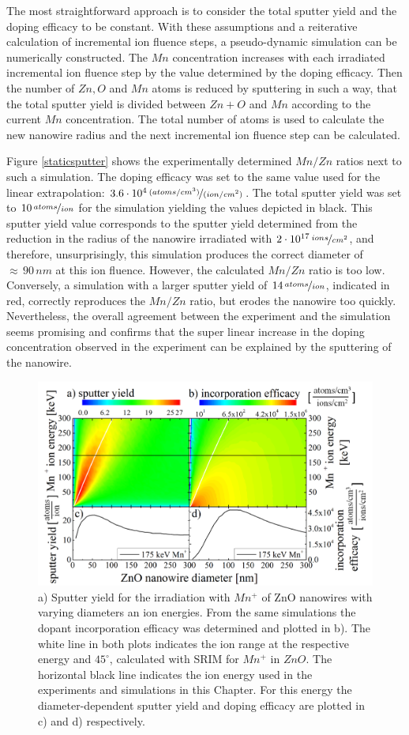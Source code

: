 The most straightforward approach is to consider the total sputter yield and the doping efficacy to be constant. With these assumptions and a reiterative calculation of incremental ion fluence steps, a pseudo-dynamic simulation can be numerically constructed. The $Mn$ concentration increases with each irradiated incremental ion fluence step by the value determined by the doping efficacy. Then the number of $Zn, O$ and $Mn$ atoms is reduced by sputtering in such a way, that the total sputter yield is divided between $Zn+O$ and $Mn$ according to the current $Mn$ concentration. The total number of atoms is used to calculate the new nanowire radius and the next incremental ion fluence step can be calculated.

Figure \ref{staticsputter} shows the experimentally determined $Mn/Zn$ ratios next to such a simulation. The doping efficacy was set to the same value used for the linear extrapolation: $3.6\cdot10^4\,\nicefrac{(atoms/cm^3)}{(ion/cm^2)}$. The total sputter yield was set to $10\,\nicefrac{atoms}{ion}$ for the simulation yielding the values depicted in black. This sputter yield value corresponds to the sputter yield determined from the reduction in the radius of the nanowire irradiated with $2\cdot10^{17}\,\nicefrac{ions}{cm^2}$, and therefore, unsurprisingly, this simulation produces the correct diameter of $\approx\,90\,nm$ at this ion fluence. However, the calculated $Mn/Zn$ ratio is too low. Conversely, a simulation with a larger sputter yield of $14\,\nicefrac{atoms}{ion}$, indicated in red, correctly reproduces the $Mn/Zn$ ratio, but erodes the nanowire too quickly. Nevertheless, the overall agreement between the experiment and the simulation seems promising and confirms that the super linear increase in the doping concentration observed in the experiment can be explained by the sputtering of the nanowire.

\begin{figure}
	\centering
		\includegraphics[width=.8\textwidth]{images/sputterincorporate.png}
	\caption{a) Sputter yield for the irradiation with $Mn^+$ of ZnO nanowires with varying diameters an ion energies. From the same simulations the dopant incorporation efficacy was determined and plotted in b). The white line in both plots indicates the ion range at the respective energy and $45^\circ$, calculated with SRIM for $Mn^+$ in $ZnO$. The horizontal black line indicates the ion energy used in the experiments and simulations in this Chapter. For this energy the diameter-dependent sputter yield and doping efficacy are plotted in c) and d) respectively.}
	\label{sputterincorporate}
\end{figure} 

